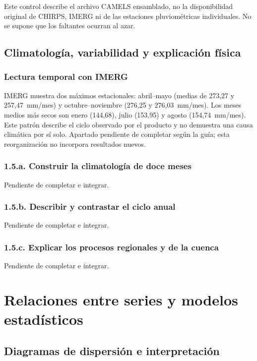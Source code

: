 \documentclass[10pt,a4paper]{article}
\begin{document}
Este control describe el archivo CAMELS ensamblado, no la disponibilidad original
de CHIRPS, IMERG ni de las estaciones pluviométricas individuales. No se supone
que los faltantes ocurran al azar.


\subsection{Climatología, variabilidad y explicación física}
\subsubsection*{Lectura temporal con IMERG}
IMERG muestra dos máximos estacionales: abril--mayo (medias de 273,27 y 257,47~mm/mes) y octubre--noviembre (276,25 y 276,03~mm/mes). Los meses medios más secos son enero (144,68), julio (153,95) y agosto (154,74~mm/mes). Este patrón describe el ciclo observado por el producto y no demuestra una causa climática por sí solo.
Apartado pendiente de completar según la guía; esta reorganización no incorpora resultados nuevos.
\subsubsection*{1.5.a. Construir la climatología de doce meses}
Pendiente de completar e integrar.
\subsubsection*{1.5.b. Describir y contrastar el ciclo anual}
Pendiente de completar e integrar.
\subsubsection*{1.5.c. Explicar los procesos regionales y de la cuenca}
Pendiente de completar e integrar.
\clearpage
\section{Relaciones entre series y modelos estadísticos}

\subsection{Diagramas de dispersión e interpretación}
\end{document}
